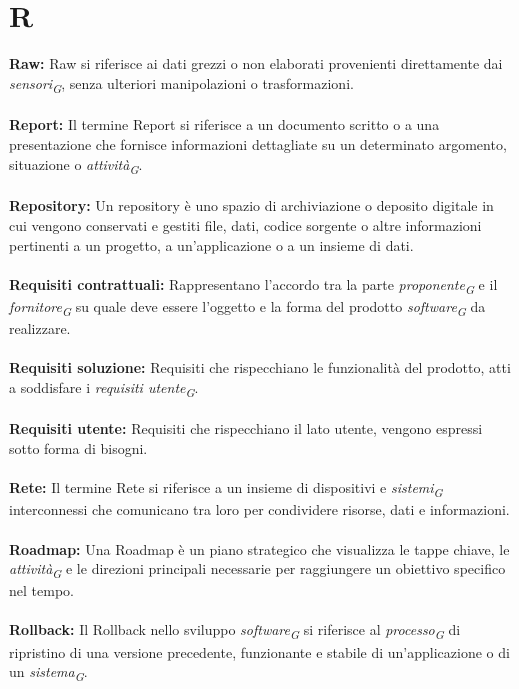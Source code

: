 \documentclass{article}
\begin{document}
\section*{R}
{}
\textbf{Raw:} Raw si riferisce ai dati grezzi o non elaborati provenienti direttamente dai \textit{sensori}\textsubscript{\textit{G}}, senza ulteriori manipolazioni o trasformazioni.
\\
\\
\textbf{Report:} Il termine Report si riferisce a un documento scritto o a una presentazione che fornisce informazioni dettagliate su un determinato argomento, situazione o \textit{attività}\textsubscript{\textit{G}}.
\\
\\
\textbf{Repository:} Un repository è uno spazio di archiviazione o deposito digitale in cui vengono conservati e gestiti file, dati, codice sorgente o altre informazioni pertinenti a un progetto, a un'applicazione o a un insieme di dati.
\\
\\
\textbf{Requisiti contrattuali:} Rappresentano l’accordo tra la parte \textit{proponente}\textsubscript{\textit{G}} e il \textit{fornitore}\textsubscript{\textit{G}} su quale deve essere l’oggetto e la forma del prodotto \textit{software}\textsubscript{\textit{G}} da realizzare.
\\
\\
\textbf{Requisiti soluzione:} Requisiti che rispecchiano le funzionalità del prodotto, atti a soddisfare i \textit{requisiti utente}\textsubscript{\textit{G}}.
\\
\\
\textbf{Requisiti utente:} Requisiti che rispecchiano il lato utente, vengono espressi sotto forma di bisogni.
\\
\\
\textbf{Rete:} Il termine Rete si riferisce a un insieme di dispositivi e \textit{sistemi}\textsubscript{\textit{G}} interconnessi che comunicano tra loro per condividere risorse, dati e informazioni.
\\
\\
\textbf{Roadmap:} Una Roadmap è un piano strategico che visualizza le tappe chiave, le \textit{attività}\textsubscript{\textit{G}} e le direzioni principali necessarie per raggiungere un obiettivo specifico nel tempo.
\\
\\
\textbf{Rollback:} Il Rollback nello sviluppo \textit{software}\textsubscript{\textit{G}} si riferisce al \textit{processo}\textsubscript{\textit{G}} di ripristino di una versione precedente, funzionante e stabile di un'applicazione o di un \textit{sistema}\textsubscript{\textit{G}}.
\end{document}
